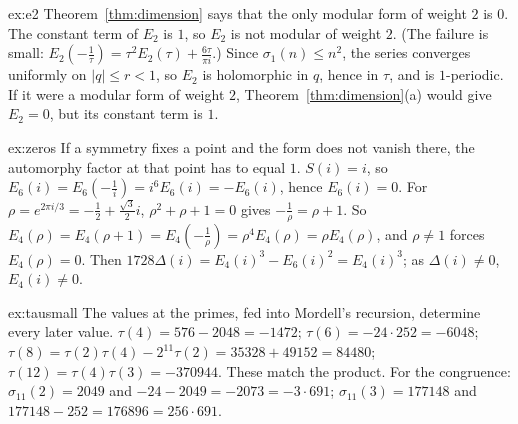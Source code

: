 \begin{solution}{ex:e2}
\idea Theorem~\ref{thm:dimension} says that the only modular form of weight $2$ is $0$. The constant term of $E_2$ is $1$, so $E_2$ is not modular of weight $2$. (The failure is small: $E_2(-\frac1\tau)=\tau^2E_2(\tau)+\frac{6\tau}{\pi i}$.)
\writeup Since $\sigma_1(n)\le n^2$, the series converges uniformly on $|q|\le r<1$, so $E_2$ is holomorphic in $q$, hence in $\tau$, and is $1$-periodic. If it were a modular form of weight $2$, Theorem~\ref{thm:dimension}(a) would give $E_2=0$,
but its constant term is $1$.
\end{solution}

\begin{solution}{ex:zeros}
\idea If a symmetry fixes a point and the form does not vanish there, the automorphy factor at that point has to equal $1$.
\writeup $S(i)=i$, so $E_6(i)=E_6(-\frac1i)=i^6E_6(i)=-E_6(i)$, hence $E_6(i)=0$. For $\rho=e^{2\pi i/3}=-\frac12+\frac{\sqrt3}2i$, $\rho^2+\rho+1=0$ gives $-\frac1\rho=\rho+1$. So
$E_4(\rho)=E_4(\rho+1)=E_4(-\frac1\rho)=\rho^4E_4(\rho)=\rho E_4(\rho)$, and $\rho\ne1$ forces $E_4(\rho)=0$. Then $1728\Delta(i)=E_4(i)^3-E_6(i)^2=E_4(i)^3$; as $\Delta(i)\ne0$, $E_4(i)\ne0$.
\end{solution}

\begin{solution}{ex:tausmall}
\idea The values at the primes, fed into Mordell's recursion, determine every later value.
\writeup $\tau(4)=576-2048=-1472$; $\tau(6)=-24\cdot252=-6048$; $\tau(8)=\tau(2)\tau(4)-2^{11}\tau(2)=35328+49152=84480$; $\tau(12)=\tau(4)\tau(3)=-370944$. These match the product. For the congruence:
$\sigma_{11}(2)=2049$ and $-24-2049=-2073=-3\cdot691$; $\sigma_{11}(3)=177148$ and $177148-252=176896=256\cdot691$.
\end{solution}

